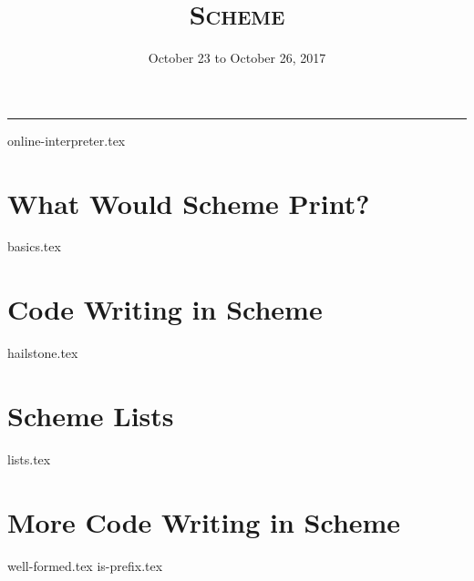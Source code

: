 \documentclass{exam}
\title{\textsc{Scheme}}
\date{October 23 to October 26, 2017}
\begin{document}
\maketitle
\rule{\textwidth}{0.15em}
\fontsize{12}{15}\selectfont

{online-interpreter.tex}
\begin{questions}
\section{What Would Scheme Print?}
{basics.tex}

\section{Code Writing in Scheme}
{hailstone.tex}

\section{Scheme Lists}
{lists.tex}

\section{More Code Writing in Scheme}
{well-formed.tex}
{is-prefix.tex}

\end{questions}
\end{document}
